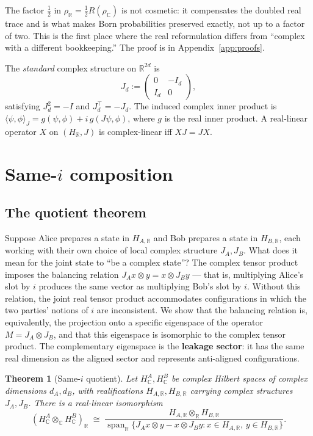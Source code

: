 \documentclass[a4paper,onecolumn,noarxiv]{quantumarticle}
\theoremstyle{plain}
\newtheorem{theorem}{Theorem}
\theoremstyle{definition}
\theoremstyle{remark}
\newcommand{\R}{\mathbb{R}}
\newcommand{\C}{\mathbb{C}}
\newcommand{\HC}{H_{\C}}
\newcommand{\HR}{H_{\R}}
\newcommand{\Mop}{M}
\begin{document}
The factor $\tfrac{1}{2}$ in $\rho_\R = \tfrac{1}{2}R(\rho_\C)$ is not cosmetic:
it compensates the doubled real trace and is what makes Born probabilities preserved
exactly, not up to a factor of two. This is the first place where the real
reformulation differs from ``complex with a different bookkeeping.'' The proof is in
Appendix~\ref{app:proofs}.

The \emph{standard} complex structure on $\R^{2d}$ is
\begin{equation}
  J_d := \begin{pmatrix} 0 & -I_d \\ I_d & 0 \end{pmatrix},
  \label{eq:canonicalJ}
\end{equation}
satisfying $J_d^2=-I$ and $J_d^\top=-J_d$. The induced complex inner product is
$\langle\psi,\phi\rangle_J = g(\psi,\phi) + i\,g(J\psi,\phi)$, where $g$ is the
real inner product. A real-linear operator $X$ on $(\HR,J)$ is complex-linear iff
$XJ=JX$.

\section{Same-$i$ composition}
\label{sec:samei}

\subsection{The quotient theorem}

Suppose Alice prepares a state in $H_{A,\R}$ and Bob prepares a state in $H_{B,\R}$,
each working with their own choice of local complex structure $J_A,J_B$. What does
it mean for the joint state to ``be a complex state''? The complex tensor product
imposes the balancing relation $J_A x\otimes y = x\otimes J_B y$ --- that is,
multiplying Alice's slot by $i$ produces the same vector as multiplying Bob's slot
by $i$. Without this relation, the joint real tensor product accommodates
configurations in which the two parties' notions of $i$ are inconsistent. We show
that the balancing relation is, equivalently, the projection onto a specific
eigenspace of the operator $\Mop=J_A\otimes J_B$, and that this eigenspace is
isomorphic to the complex tensor product. The complementary eigenspace is the
\textbf{leakage sector}: it has the same real dimension as the aligned sector and
represents anti-aligned configurations.

\begin{theorem}[Same-$i$ quotient]
\label{thm:quotient}
Let $\HC^A,\HC^B$ be complex Hilbert spaces of complex dimensions $d_A,d_B$, with
realifications $H_{A,\R},H_{B,\R}$ carrying complex structures $J_A,J_B$. There is
a real-linear isomorphism
\begin{equation}
  (\HC^A\otimes_\C\HC^B)_\R \;\cong\;
  \frac{H_{A,\R}\otimes_\R H_{B,\R}}{\operatorname{span}_\R\{J_A x\otimes y - x\otimes J_B y
  : x\in H_{A,\R},\,y\in H_{B,\R}\}}.
\end{equation}
\end{theorem}
\end{document}

